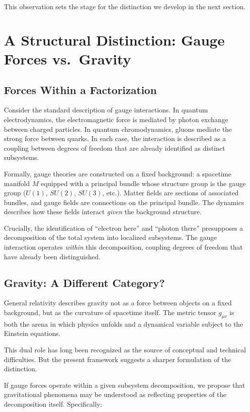\documentclass[12pt,a4paper,openany]{book}
\begin{document}
This observation sets the stage for the distinction we develop in the next section.

\section{A Structural Distinction: Gauge Forces vs.\ Gravity}
\label{D-sec:distinction}

\subsection{Forces Within a Factorization}

Consider the standard description of gauge interactions. In quantum electrodynamics, the electromagnetic force is mediated by photon exchange between charged particles. In quantum chromodynamics, gluons mediate the strong force between quarks. In each case, the interaction is described as a coupling between degrees of freedom that are already identified as distinct subsystems.

Formally, gauge theories are constructed on a fixed background: a spacetime manifold $M$ equipped with a principal bundle whose structure group is the gauge group ($U(1)$, $SU(2)$, $SU(3)$, etc.). Matter fields are sections of associated bundles, and gauge fields are connections on the principal bundle. The dynamics describes how these fields interact \emph{given} the background structure.

Crucially, the identification of ``electron here'' and ``photon there'' presupposes a decomposition of the total system into localized subsystems. The gauge interaction operates \emph{within} this decomposition, coupling degrees of freedom that have already been distinguished.

\subsection{Gravity: A Different Category?}

General relativity describes gravity not as a force between objects on a fixed background, but as the curvature of spacetime itself. The metric tensor $g_{\mu\nu}$ is both the arena in which physics unfolds and a dynamical variable subject to the Einstein equations.

This dual role has long been recognized as the source of conceptual and technical difficulties. But the present framework suggests a sharper formulation of the distinction.

If gauge forces operate within a given subsystem decomposition, we propose that gravitational phenomena may be understood as reflecting properties of the decomposition itself. Specifically:
\end{document}
